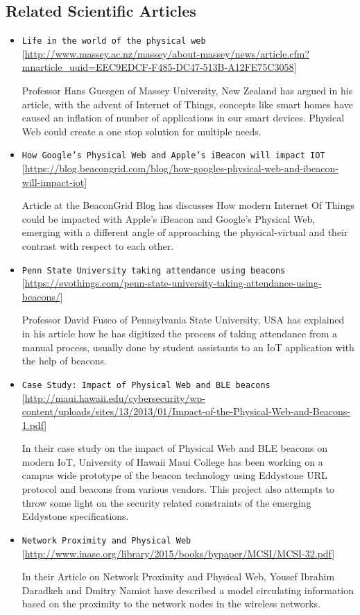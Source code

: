 \subsection{Related Scientific Articles}

\begin{itemize}
	\item \texttt{Life in the world of the physical web\cite{LifeInTheWorldOfPhysicalWeb}} [\url{http://www.massey.ac.nz/massey/about-massey/news/article.cfm?mnarticle_uuid=EEC9EDCF-F485-DC47-513B-A12FE75C3058}]
	\par Professor Hans Guesgen of Massey University, New Zealand has argued in his article, with the advent of Internet of Things, concepts like smart homes have caused an inflation of number of applications in our smart devices. Physical Web could create a one stop solution for multiple needs.
	\item \texttt{How Google's Physical Web and Apple's iBeacon will impact IOT\cite{PhysicalWebAndiBeacon}} [\url{https://blog.beacongrid.com/blog/how-googles-physical-web-and-ibeacon-will-impact-iot}]
	\par Article at the BeaconGrid Blog has discusses How modern Internet Of Things could be impacted with Apple's iBeacon and  Google’s Physical Web, emerging with a different angle of approaching the physical-virtual and their contrast with respect to each other.
	\item \texttt{Penn State University taking attendance using beacons\cite{PennStateUniversitytakingattendanceusingbeacons}} [\url{https://evothings.com/penn-state-university-taking-attendance-using-beacons/}]
	\par Professor David Fusco of Pennsylvania State University, USA has explained in his article  how he has digitized the process of taking attendance from a manual process, usually done by student assistants to an IoT application with the help of beacons.
	\item \texttt{Case Study: Impact of Physical Web and BLE beacons\cite{IOTImpactofPhysicalWebBLE}}
	[\url{http://maui.hawaii.edu/cybersecurity/wp-content/uploads/sites/13/2013/01/Impact-of-the-Physical-Web-and-Beacons-1.pdf}]
	\par In their case study on the impact of Physical Web and BLE beacons on modern IoT, University of Hawaii Maui College has been working on a campus wide prototype of the beacon technology using Eddystone URL protocol and beacons from various vendors. This project also attempts to throw some light on the security related constraints of the  emerging Eddystone specifications.
	\item \texttt{Network Proximity and Physical Web\cite{NetworkProximityandPhysicalWeb}}
	[\url{http://www.inase.org/library/2015/books/bypaper/MCSI/MCSI-32.pdf}]
	\par In their Article on Network Proximity and Physical Web, Yousef Ibrahim Daradkeh and Dmitry Namiot have described a model circulating information based on the proximity to the network nodes in the wireless networks.
\end{itemize}
